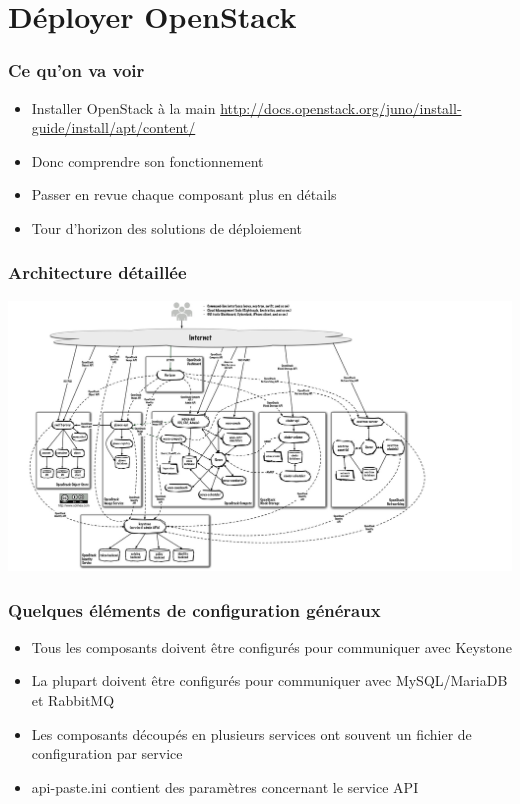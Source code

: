   \section{Déployer OpenStack}

  \begin{frame}
    \frametitle{Ce qu'on va voir}
    \begin{itemize}
      \item Installer OpenStack à la main \url{http://docs.openstack.org/juno/install-guide/install/apt/content/}
      \item Donc comprendre son fonctionnement
      \item Passer en revue chaque composant plus en détails
      \item Tour d'horizon des solutions de déploiement
    \end{itemize}
  \end{frame}

  \begin{frame}
    \frametitle{Architecture détaillée}
    \begin{center}
      \includegraphics[width=\textwidth]{images/architecture.jpg}
    \end{center}
  \end{frame}

  \begin{frame}
    \frametitle{Quelques éléments de configuration généraux}
    \begin{itemize}
      \item Tous les composants doivent être configurés pour communiquer avec Keystone
      \item La plupart doivent être configurés pour communiquer avec MySQL/MariaDB et RabbitMQ
      \item Les composants découpés en plusieurs services ont souvent un fichier de configuration par service
      \item api-paste.ini contient des paramètres concernant le service API
    \end{itemize}
  \end{frame}

